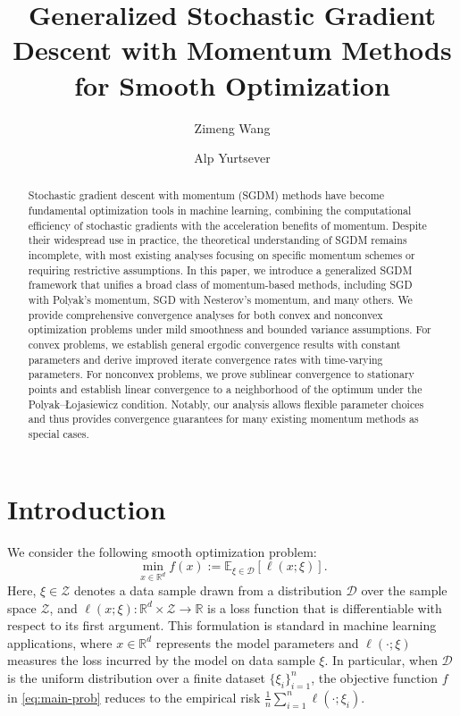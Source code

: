 \documentclass[10pt]{article}
\title{Generalized Stochastic Gradient Descent with Momentum Methods for Smooth Optimization}
\author[1]{Zimeng Wang}
\author[2]{Alp Yurtsever}
\affil[1,2]{Department of Mathematics and Mathematical Statistics, Umeå University, Sweden}
\affil[1]{\texttt{zimeng.wang@umu.se}}
\affil[2]{\texttt{alp.yurtsever@umu.se}}
\date{}
\numberwithin{equation}{section}
\theoremstyle{definition}
\newcommand{\rbb}{\mathbb{R}}  %
\newcommand{\ebb}{\mathbb{E}}  %
\begin{document}
\maketitle

\begin{abstract}
Stochastic gradient descent with momentum (SGDM) methods have become fundamental optimization tools in machine learning, combining the computational efficiency of stochastic gradients with the acceleration benefits of momentum. Despite their widespread use in practice, the theoretical understanding of SGDM remains incomplete, with most existing analyses focusing on specific momentum schemes or requiring restrictive assumptions.
In this paper, we introduce a generalized SGDM framework that unifies a broad class of momentum-based methods, including SGD with Polyak's momentum, SGD with Nesterov's momentum, and many others. We provide comprehensive convergence analyses for both convex and nonconvex optimization problems under mild smoothness and bounded variance assumptions. For convex problems, we establish general ergodic convergence results with constant parameters and derive improved iterate convergence rates with time-varying parameters. 
%
For nonconvex problems, we prove sublinear convergence to stationary points and establish linear convergence to a neighborhood of the optimum under the Polyak--\L{}ojasiewicz condition. Notably, our analysis allows flexible parameter choices and thus provides convergence guarantees for many existing momentum methods as special cases.
%
\end{abstract}

\section{Introduction}
We consider the following smooth optimization problem:
\begin{equation}\label{eq:main-prob}
    \min_{x\in\rbb^d} f(x):=\ebb_{\xi\in \mathcal{D}}[\ell(x;\xi)].
\end{equation}
Here, $\xi\in \mathcal{Z}$ denotes a data sample drawn from a distribution $\mathcal{D}$ over the sample space $\mathcal{Z}$, and $\ell(x; \xi): \rbb^d \times \mathcal{Z} \rightarrow \rbb$ is a loss function that is differentiable with respect to its first argument. This formulation is standard in machine learning applications, where $x\in \rbb^d$ represents the model parameters and $\ell(\cdot; \xi)$ measures the loss incurred by the model on data sample $\xi$. In particular, when $\mathcal{D}$ is the uniform distribution over a finite dataset $\{\xi_i\}_{i=1}^n$, the objective function $f$ in \eqref{eq:main-prob} reduces to the empirical risk $\frac{1}{n}\sum_{i=1}^n\ell(\cdot;\xi_i)$.
\end{document}
